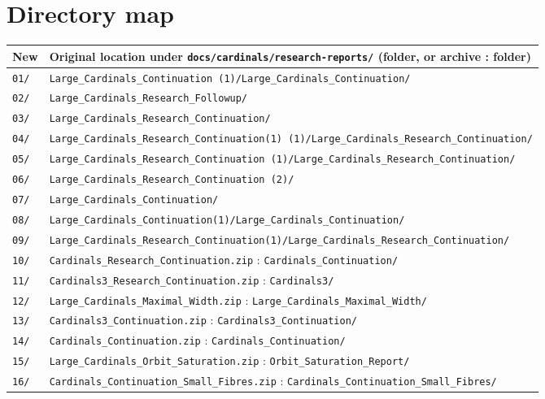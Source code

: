 \documentclass[11pt,letterpaper]{article}
\theoremstyle{definition}
\numberwithin{equation}{section}
\begin{document}
\section{Directory map}\label{app:map}

\begin{center}
\small
\renewcommand{\arraystretch}{1.12}
\begin{tabularx}{\textwidth}{@{}lY@{}}
\toprule
\textbf{New}&\textbf{Original location under \nolinkurl{docs/cardinals/research-reports/} (folder, or archive : folder)}\\\midrule
\nolinkurl{01/}&\nolinkurl{Large_Cardinals_Continuation (1)/Large_Cardinals_Continuation/}\\
\nolinkurl{02/}&\nolinkurl{Large_Cardinals_Research_Followup/}\\
\nolinkurl{03/}&\nolinkurl{Large_Cardinals_Research_Continuation/}\\
\nolinkurl{04/}&\nolinkurl{Large_Cardinals_Research_Continuation(1) (1)/Large_Cardinals_Research_Continuation/}\\
\nolinkurl{05/}&\nolinkurl{Large_Cardinals_Research_Continuation (1)/Large_Cardinals_Research_Continuation/}\\
\nolinkurl{06/}&\nolinkurl{Large_Cardinals_Research_Continuation (2)/}\\
\nolinkurl{07/}&\nolinkurl{Large_Cardinals_Continuation/}\\
\nolinkurl{08/}&\nolinkurl{Large_Cardinals_Continuation(1)/Large_Cardinals_Continuation/}\\
\nolinkurl{09/}&\nolinkurl{Large_Cardinals_Research_Continuation(1)/Large_Cardinals_Research_Continuation/}\\
\nolinkurl{10/}&\nolinkurl{Cardinals_Research_Continuation.zip} : \nolinkurl{Cardinals_Continuation/}\\
\nolinkurl{11/}&\nolinkurl{Cardinals3_Research_Continuation.zip} : \nolinkurl{Cardinals3/}\\
\nolinkurl{12/}&\nolinkurl{Large_Cardinals_Maximal_Width.zip} : \nolinkurl{Large_Cardinals_Maximal_Width/}\\
\nolinkurl{13/}&\nolinkurl{Cardinals3_Continuation.zip} : \nolinkurl{Cardinals3_Continuation/}\\
\nolinkurl{14/}&\nolinkurl{Cardinals_Continuation.zip} : \nolinkurl{Cardinals_Continuation/}\\
\nolinkurl{15/}&\nolinkurl{Large_Cardinals_Orbit_Saturation.zip} : \nolinkurl{Orbit_Saturation_Report/}\\
\nolinkurl{16/}&\nolinkurl{Cardinals_Continuation_Small_Fibres.zip} : \nolinkurl{Cardinals_Continuation_Small_Fibres/}\\

\end{tabularx}
\end{center}
\end{document}
